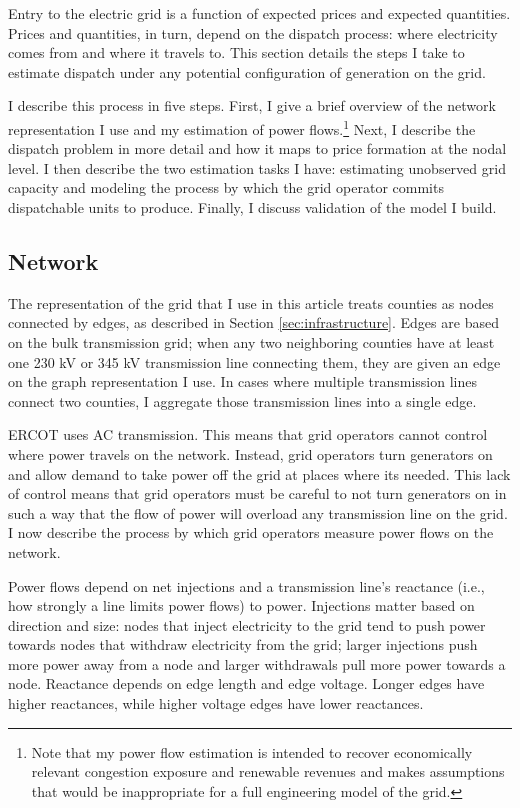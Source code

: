 \documentclass[12pt]{article}
\begin{document}
Entry to the electric grid is a function of expected prices and expected quantities. Prices and quantities, in turn, depend on the dispatch process: where electricity comes from and where it travels to. This section details the steps I take to estimate dispatch under any potential configuration of generation on the grid. 

I describe this process in five steps. First, I give a brief overview of the network representation I use and my estimation of power flows.\footnote{Note that my power flow estimation is intended to recover economically relevant congestion exposure and renewable revenues and makes assumptions that would be inappropriate for a full engineering model of the grid.} Next, I describe the dispatch problem in more detail and how it maps to price formation at the nodal level. I then describe the two estimation tasks I have: estimating unobserved grid capacity and modeling the process by which the grid operator commits dispatchable units to produce. Finally, I discuss validation of the model I build. 

\subsection{Network}
\label{sec:network}

The representation of the grid that I use in this article treats counties as nodes connected by edges, as described in Section \ref{sec:infrastructure}. Edges are based on the bulk transmission grid; when any two neighboring counties have at least one 230 kV or 345 kV transmission line connecting them, they are given an edge on the graph representation I use. In cases where multiple transmission lines connect two counties, I aggregate those transmission lines into a single edge. 

ERCOT uses AC transmission. This means that grid operators cannot control where power travels on the network. Instead, grid operators turn generators on and allow demand to take power off the grid at places where its needed. This lack of control means that grid operators must be careful to not turn generators on in such a way that the flow of power will overload any transmission line on the grid. I now describe the process by which grid operators measure power flows on the network.

Power flows depend on net injections and a transmission line's reactance (i.e., how strongly a line limits power flows) to power. Injections matter based on direction and size: nodes that inject electricity to the grid tend to push power towards nodes that withdraw electricity from the grid; larger injections push more power away from a node and larger withdrawals pull more power towards a node. Reactance depends on edge length and edge voltage. Longer edges have higher reactances, while higher voltage edges have lower reactances. 
\end{document}
